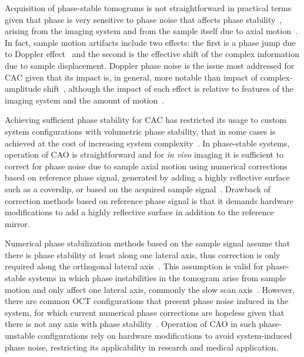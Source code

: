 Acquisition of phase-stable tomograms is not straightforward in practical terms given that phase is very sensitive to phase noise that affects phase stability~\cite{Shemonski2014_Stability, Vakoc2005_Phaseresolved}, arising from the imaging system and from the sample itself due to axial motion~\cite{Shemonski2014_Stability-1, Shemonski2014_Threedimensional}. In fact, sample motion artifacts include two effects: the first is a phase jump due to Doppler effect~\cite{Chen1997_Optical, White2003_vivo} and the second is the effective shift of the complex information due to sample displacement. Doppler phase noise is the issue most addressed for CAC given that its impact is, in general, more notable than impact of complex-amplitude shift~\cite{Shemonski2014_Stability-1, Shemonski2014_Threedimensional}, although the impact of each effect is relative to features of the imaging system and the amount of motion~\cite{Shemonski2014_Stability}.

Achieving sufficient phase stability for CAC has restricted its usage to custom system configurations with volumetric phase stability, that in some cases is achieved at the cost of increasing system complexity~\cite{Ginner2018_Holographic, Kumar2013_Subaperture, Hillmann2016_Aberrationfree, Sudkamp2018_Simple}. In phase-stable systems, operation of CAO is straightforward and for \textit{in vivo} imaging it is sufficient to correct for phase noise due to sample axial motion using numerical corrections based on reference phase signal, generated by adding a highly reflective surface such as a coverslip, or based on the acquired sample signal~\cite{White2003_vivo, Ralston2006_Phase}. Drawback of correction methods based on reference phase signal is that it demands hardware modifications to add a highly reflective surface in addition to the reference mirror.

Numerical phase stabilization methods based on the sample signal assume that there is phase stability at least along one lateral axis, thus correction is only required along the orthogonal lateral axis~\cite{Shemonski2014_Threedimensional}. This assumption is valid for phase-stable systems in which phase instabilities in the tomogram arise from sample motion and only affect one lateral axis, commonly the slow scan axis~\cite{Shemonski2014_Threedimensional}. However, there are common OCT configurations that present phase noise induced in the system, for which current numerical phase corrections are hopeless given that there is not any axis with phase stability~\cite{Vakoc2005_Phaseresolved}. Operation of CAO in such phase-unstable configurations rely on hardware modifications to avoid system-induced phase noise, restricting its applicability in research and medical application.

